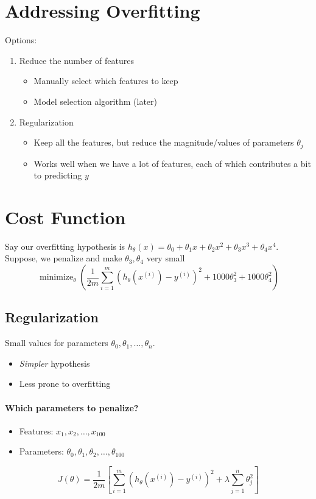 \documentclass[a4paper, 12pt]{report}
\DeclareMathOperator*{\minimize}{minimize}
\begin{document}
\section{Addressing Overfitting}
Options:
\begin{enumerate}
	\item Reduce the number of features
	      \begin{itemize}
		      \item Manually select which features to keep
		      \item Model selection algorithm (later)
	      \end{itemize}
	\item Regularization
	      \begin{itemize}
		      \item Keep all the features, but reduce the magnitude/values of parameters
		            $\theta_j$
		      \item Works well when we have a lot of features, each of which contributes
		            a bit to predicting $y$
	      \end{itemize}
\end{enumerate}

\section{Cost Function}
Say our overfitting hypothesis is
$h_\theta(x) = \theta_0 + \theta_1x + \theta_2x^2 + \theta_3x^3 + \theta_4x^4$.
Suppose, we penalize and make $\theta_3, \theta_4$ very small
\begin{equation*}
	\minimize_\theta\left(
	\frac{1}{2m}\sum_{i=1}^m\left(
		h_\theta(x^{(i)}) - y^{(i)}
		\right)^2 + 1000\theta_3^2 + 1000\theta_4^2
	\right)
\end{equation*}

\subsection*{Regularization}
Small values for parameters $\theta_0, \theta_1, \dots, \theta_n$.
\begin{itemize}
	\item \emph{Simpler} hypothesis
	\item Less prone to overfitting
\end{itemize}

\paragraph{Which parameters to penalize?}
\begin{itemize}
	\item Features: $x_1, x_2, \dots, x_{100}$
	\item Parameters: $\theta_0, \theta_1, \theta_2, \dots, \theta_{100}$
\end{itemize}
\begin{equation*}
	J(\theta) = \frac{1}{2m}\left[
		\sum_{i=1}^m\left(
		h_\theta(x^{(i)}) - y^{(i)}
		\right)^2 + \lambda\sum_{j=1}^n\theta_j^2
		\right]
\end{equation*}
\end{document}
